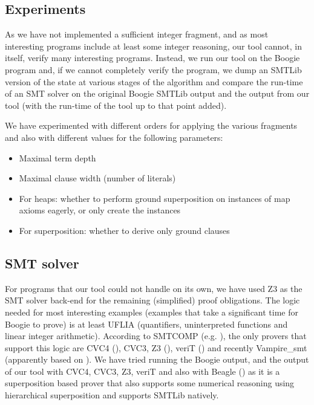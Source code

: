 \subsection*{Experiments}
As we have not implemented a sufficient integer fragment, and as most interesting programs include at least some integer reasoning, our tool cannot, in itself, verify many interesting programs. Instead, we run our tool on the Boogie program and, if we cannot completely verify the program, we dump an SMTLib version of the state at various stages of the algorithm and compare the run-time of an SMT solver on the original Boogie SMTLib output and the output from our tool (with the run-time of the tool up to that point added). 

We have experimented with different orders for applying the various fragments and also with different values for the following parameters:
\begin{itemize}
	\item Maximal term depth
	\item Maximal clause width (number of literals)
	\item For heaps: whether to perform ground superposition on instances of map axioms eagerly, or only create the instances
	\item For superposition: whether to derive only ground clauses
\end{itemize}

\subsection*{SMT solver}
For programs that our tool could not handle on its own, we have used Z3 as the SMT solver back-end for the remaining (simplified) proof obligations.
The logic needed for most interesting examples (examples that take a significant time for Boogie to prove) is at least UFLIA (quantifiers, uninterpreted functions and linear integer arithmetic).
According to SMTCOMP (e.g. \cite{CDW14}), the only provers that support this logic are CVC4 (\cite{DBLP:conf/cav/BarrettCDHJKRT11}), CVC3, Z3 (\cite{DBLP:conf/tacas/MouraB08}), veriT (\cite{DBLP:conf/cade/2009}) and recently Vampire\_smt (apparently based on \cite{Voronkov14}). We have tried running the Boogie output, and the output of our tool with CVC4, CVC3, Z3, veriT and also with Beagle (\cite{DBLP:conf/cade/BaumgartnerBW15}) as it is a superposition based prover that also supports some numerical reasoning using hierarchical superposition and supports SMTLib natively.

